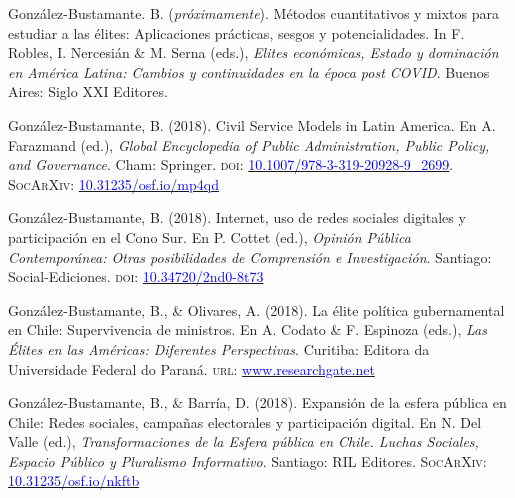 \begin{publications}

\begin{benumerate}{13}
\item{\small González-Bustamante. B. ({\itshape próximamente}). Métodos cuantitativos y mixtos para estudiar a las élites: Aplicaciones prácticas, sesgos y potencialidades. In F. Robles, I. Nercesián \& M. Serna (eds.), {\itshape Elites económicas, Estado y dominación en América Latina: Cambios y continuidades en la época post COVID}. Buenos Aires: Siglo XXI Editores.}\vspace{1mm}

\item{\small Gonz\'alez-Bustamante, B. (2018). Civil Service Models in Latin America. En A. Farazmand (ed.), {\itshape Global Encyclopedia of Public Administration, Public Policy, and Governance}. Cham: Springer. {\scshape doi}: \href{https://doi.org/10.1007/978-3-319-20928-9\_2699}{\textcolor{blue}{10.1007/978-3-319-20928-9\_2699}}. {\scshape \footnotesize SocArXiv}: \href{https://doi.org/10.31235/osf.io/mp4qd}{\textcolor{blue}{10.31235/osf.io/mp4qd}}}\vspace{1mm}

\item{\small Gonz\'alez-Bustamante, B. (2018). Internet, uso de redes sociales digitales y participación en el Cono Sur. En P. Cottet (ed.), {\itshape Opini\'on P\'ublica Contempor\'anea: Otras posibilidades de Comprensi\'on e Investigaci\'on}. Santiago: Social-Ediciones. {\scshape doi}: \href{https://doi.org/10.34720/2nd0-8t73}{\textcolor{blue}{10.34720/2nd0-8t73}}}\vspace{1mm}

\item{\small Gonz\'alez-Bustamante, B., \& Olivares, A. (2018). La élite política gubernamental en Chile: Supervivencia de ministros. En A. Codato \& F. Espinoza (eds.), {\itshape Las \'Elites en las Am\'ericas: Diferentes Perspectivas}. Curitiba: Editora da Universidade Federal do Paraná. {\scshape url}: \href{https://www.researchgate.net/publication/325699783_Elites_en_las_Americas_diferentes_perspectivas_Elites_in_the_Americas_Different_Perspectives}{\textcolor{blue}{www.researchgate.net}}} \vspace{1mm}

\item{\small Gonz\'alez-Bustamante, B., \& Barr\'ia, D. (2018). Expansión de la esfera pública en Chile: Redes sociales, campañas electorales y participación digital. En N. Del Valle (ed.), {\itshape Transformaciones de la Esfera p\'ublica en Chile. Luchas Sociales, Espacio P\'ublico y Pluralismo Informativo}. Santiago: RIL Editores. {\scshape \footnotesize SocArXiv}: \href{https://doi.org/10.31235/osf.io/nkftb}{\textcolor{blue}{10.31235/osf.io/nkftb}}}\vspace{1mm}


\end{benumerate}
\end{publications}
